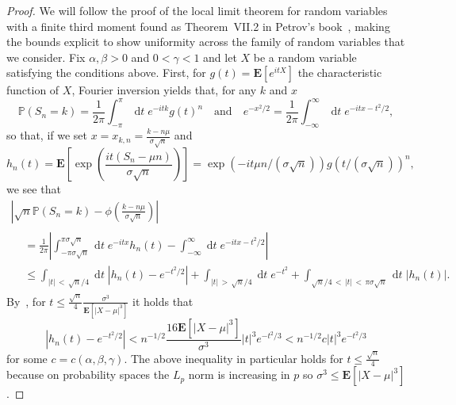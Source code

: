 \documentclass[AHL,Unicode,longabstracts,published]{cedram}
\renewcommand{\P}{\mathbb{P}}
\newcommand{\E}[1]{{\mathbf E}\left[#1\right]}
\newcommand{\bfE}{\mathbf{E}}
\DeclareMathOperator{\dtseq}{d\mathit{t}}
\begin{document}
\begin{proof}
We will follow the proof of the local limit theorem for random variables with a finite third moment found as Theorem~VII.2 in Petrov's book~\cite{Petrov}, making the bounds explicit to show uniformity across the family of random variables that we consider. Fix $\alpha, \beta>0$ and $0<\gamma<1$ and let $X$ be a random variable satisfying the conditions above. First, for $g(t)=\bfE[e^{itX}]$ the characteristic function of $X$, Fourier inversion yields that, for any $k$ and $x$
\[
\P\left(S_n=k\right)=\frac{1}{2\pi}\int_{-\pi}^\pi \dtseq e^{-itk}g(t)^n \quad \text{and} \quad e^{-x^2/2}=\frac{1}{2\pi} \int_{-\infty}^\infty \dtseq e^{-itx-t^2/2},
\]
so that, if we set $x=x_{k,n}= \frac{k-n\mu}{\sigma\sqrt{n}}$ and
\[
h_n(t)=\E{\exp\left(\frac{it(S_n-\mu n)}{\sigma \sqrt{n}}\right)}=\exp\left(-it\mu n/\left(\sigma \sqrt{n}\right)\right)g\left(t/\left(\sigma \sqrt{n}\right)\right)^n,
\]
we see that
\begin{multline}\label{eq:OoO}
\left|\sqrt{n}\P\left(S_n=k\right)-\phi\left(\frac{k-n\mu}{\sigma\sqrt{n}}\right) \right|\\
\begin{aligned}
&=\frac{1}{2\pi}\left| \int_{-\pi\sigma \sqrt{n }}^{\pi\sigma \sqrt{n }} \dtseq e^{-itx }h_{n}(t) -\int_{-\infty}^\infty \dtseq e^{-itx-t^2/2}\right| \\
&\leq \int_{|t|\,<\,\sqrt{n}/4} \dtseq \left| h_{n}(t)-e^{-t^2/2}\right| + \int_{|t|\,>\,\sqrt{n}/4} \dtseq e^{-t^2} + \int_{\sqrt{n}/4\,<\,|t|\,<\,\pi\sigma \sqrt{n }} \dtseq |h_{n}(t)|.
\end{aligned}
\end{multline}
By~\cite[Lemma~V.1]{Petrov}, for $t\leq \frac{\sqrt{n}}{4} \frac{\sigma^{3}}{\E{|X-\mu|^3}}$ it holds that
\[
\left| h_{n}(t)-e^{-t^2/2}\right| < n^{-1/2} \frac{16\E{|X-\mu|^3} }{\sigma^3} |t|^3 e^{-t^2/3}< n^{-1/2} c |t|^3 e^{-t^2/3}
\]
for some $c=c(\alpha, \beta, \gamma) $. The above inequality in particular holds for $t\leq \frac{\sqrt{n}}{4}$ because on probability spaces the $L_p$ norm is increasing in $p$ so ${\sigma^{3}}\le \E{|X-\mu|^3}$.




\end{proof}
\end{document}
